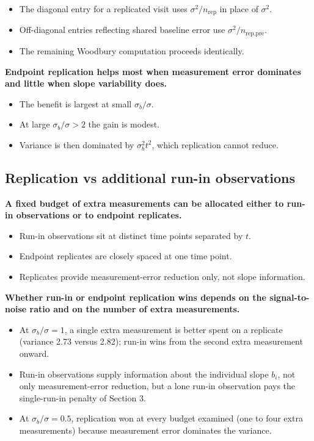 \documentclass[
  11pt,
]{article}
\begin{document}
\begin{itemize}\setlength{\itemsep}{2pt}\setlength{\parskip}{0pt}
\item The diagonal entry for a replicated visit uses $\sigma^2 / n_{\text{rep}}$ in place of $\sigma^2$.
\item Off-diagonal entries reflecting shared baseline error use $\sigma^2 / n_{\text{rep,pre}}$.
\item The remaining Woodbury computation proceeds identically.
\end{itemize}

\textbf{Endpoint replication helps most when measurement error dominates and little when slope variability does.}

\begin{itemize}\setlength{\itemsep}{2pt}\setlength{\parskip}{0pt}
\item The benefit is largest at small $\sigma_b / \sigma$.
\item At large $\sigma_b / \sigma > 2$ the gain is modest.
\item Variance is then dominated by $\sigma_b^2 t^2$, which replication cannot reduce.
\end{itemize}

\subsection{Replication vs additional run-in observations}\label{replication-vs-additional-run-in-observations}

\textbf{A fixed budget of extra measurements can be allocated either to run-in observations or to endpoint replicates.}

\begin{itemize}\setlength{\itemsep}{2pt}\setlength{\parskip}{0pt}
\item Run-in observations sit at distinct time points separated by $t$.
\item Endpoint replicates are closely spaced at one time point.
\item Replicates provide measurement-error reduction only, not slope information.
\end{itemize}

\textbf{Whether run-in or endpoint replication wins depends on the signal-to-noise ratio and on the number of extra measurements.}

\begin{itemize}\setlength{\itemsep}{2pt}\setlength{\parskip}{0pt}
\item At $\sigma_b / \sigma = 1$, a single extra measurement is better spent on a replicate (variance 2.73 versus 2.82); run-in wins from the second extra measurement onward.
\item Run-in observations supply information about the individual slope $b_i$, not only measurement-error reduction, but a lone run-in observation pays the single-run-in penalty of Section 3.
\item At $\sigma_b / \sigma = 0.5$, replication won at every budget examined (one to four extra measurements) because measurement error dominates the variance.
\end{itemize}
\end{document}
